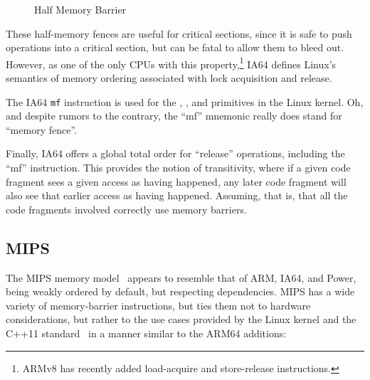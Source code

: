 \begin{figure}[tb]
\centering
{}
\caption{Half Memory Barrier}
\end{figure}

These half-memory fences are useful for critical sections, since
it is safe to push operations into a critical section, but can be
fatal to allow them to bleed out.
However, as one of the only CPUs with this property,\footnote{
	ARMv8 has recently added load-acquire and store-release instructions.}
IA64 defines
Linux's semantics of memory ordering associated with lock acquisition
and release.

The IA64 {\tt mf} instruction is used for the ,
, and  primitives in the Linux kernel.
Oh, and despite rumors to the contrary, the ``mf'' mnemonic really
does stand for ``memory fence''.

Finally, IA64 offers a global total order for ``release'' operations,
including the ``mf'' instruction.
This provides the notion of transitivity, where if a given code fragment
sees a given access as having happened, any later code fragment will
also see that earlier access as having happened.
Assuming, that is, that all the code fragments involved correctly use
memory barriers.

\subsection{MIPS}

The MIPS memory model~\cite[Table 6.6]{MIPSvII-A-2015}
appears to resemble that of ARM, IA64, and Power,
being weakly ordered by default, but respecting dependencies.
MIPS has a wide variety of memory-barrier instructions, but ties them
not to hardware considerations, but rather to the use cases provided
by the Linux kernel and the C++11 standard~\cite{RichardSmith2015N4527}
in a manner similar to the ARM64 additions:

